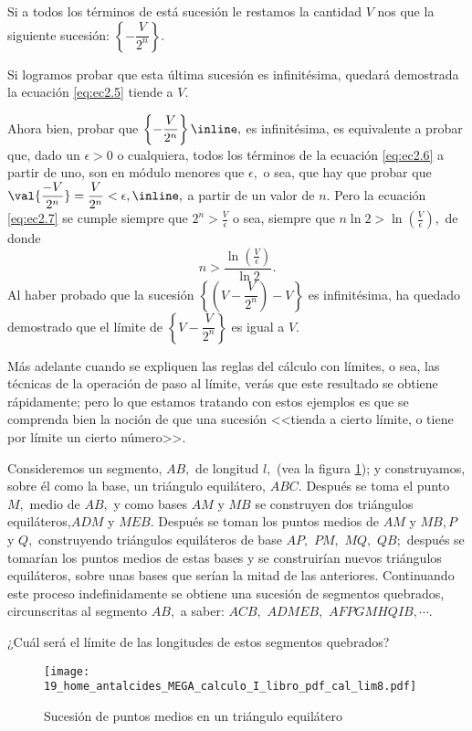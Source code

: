 Si a todos los términos de está sucesión le restamos la cantidad $V$
nos que la siguiente sucesión: $\left\{ -\dfrac{V}{2^{n}}\right\} .$

Si logramos probar que esta última sucesión es infinitésima, quedará
demostrada la ecuación \ref{eq:ec2.5} tiende a $V$.

Ahora bien, probar que $\left\{ -\dfrac{V}{2^{n}}\right\} \inline\text{\label{eq:ec2.6}},$
es infinitésima, es equivalente a probar que, dado un $\epsilon>0$
o cualquiera, todos los términos de la ecuación \ref{eq:ec2.6} a
partir de uno, son en módulo menores que $\epsilon,$ o sea, que hay
que probar que $\val{\dfrac{-V}{2^{n}}}=\dfrac{V}{2^{n}}<\epsilon,\text{\inline\text{\label{eq:ec2.7}},}$
a partir de un valor de $n.$ Pero la ecuación \ref{eq:ec2.7} se
cumple siempre que $2^{n}>\frac{V}{\epsilon}$ o sea, siempre que
$n\ln2>\ln\left(\frac{V}{\epsilon}\right),$ de donde 
\[
n>\dfrac{\ln\left(\frac{V}{\epsilon}\right)}{\ln2}.
\]
Al haber probado que la sucesión $\left\{ \left(V-\dfrac{V}{2^{n}}\right)-V\right\} $
es infinitésima, ha quedado demostrado que el límite de $\left\{ V-\dfrac{V}{2^{n}}\right\} $
es igual a $V$. \fin

Más adelante cuando se expliquen las reglas del cálculo con límites,
o sea, las técnicas de la operación de paso al límite, verás que este
resultado se obtiene rápidamente; pero lo que estamos tratando con
estos ejemplos es que se comprenda bien la noción de que una sucesión
<<tienda a cierto límite, o tiene por límite un cierto número>>.

\begin{ejemplo}

Consideremos un segmento, $AB,$ de longitud $l,$ (vea la figura
\ref{fig:cal_lim8}); y construyamos, sobre él como la base, un triángulo
equilátero, $ABC.$ Después se toma el punto $M,$ medio de $AB,$
y como bases $AM$ y $MB$ se construyen dos triángulos equiláteros,$ADM$
y $MEB.$ Después se toman los puntos medios de $AM$ y $MB,$$P$
y $Q,$ construyendo triángulos equiláteros de base $AP,$ $PM,$
$MQ,$ $QB;$ después se tomarían los puntos medios de estas bases
y se construirían nuevos triángulos equiláteros, sobre unas bases
que serían la mitad de las anteriores. Continuando este proceso indefinidamente
se obtiene una sucesión de segmentos quebrados, circunscritas al segmento
$AB,$ a saber: $ACB,$ $ADMEB,$ $AFPGMHQIB,\cdots.$ 

¿Cuál será el límite de las longitudes de estos segmentos quebrados? 

\begin{figure}[H] \centering

\texttt{[image: 19\_home\_antalcides\_MEGA\_calculo\_I\_libro\_pdf\_cal\_lim8.pdf]}
\caption{Sucesi\'on de puntos medios en un triángulo equilátero}
\label{fig:cal_lim8} \end{figure}

\end{ejemplo}

